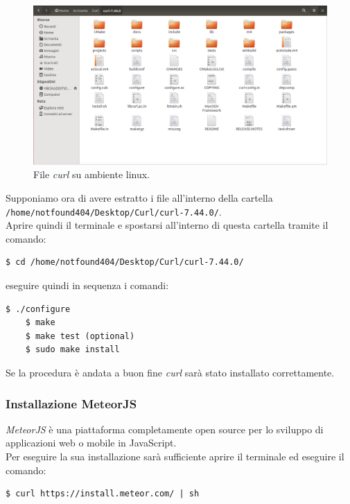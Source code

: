 \begin{figure}[h]
\begin{center}
\includegraphics[scale=0.3]{img/curl_files_linux.png}
\caption{File \emph{curl} su ambiente linux.}
\end{center}
\end{figure}

\noindent Supponiamo ora di avere estratto i file all'interno della cartella \\
\verb+/home/notfound404/Desktop/Curl/curl-7.44.0/+.\\
Aprire quindi il terminale e spostarsi all'interno di questa cartella tramite il comando:

\begin{lstlisting}[style=DOS]
	$ cd /home/notfound404/Desktop/Curl/curl-7.44.0/
\end{lstlisting}

eseguire quindi in sequenza i comandi:

\begin{lstlisting}[style=DOS]
	$ ./configure
	$ make
	$ make test (optional)
	$ sudo make install
\end{lstlisting}
Se la procedura è andata a buon fine \emph{curl} sarà stato installato correttamente.

\subsubsection{Installazione MeteorJS}
\emph{MeteorJS} è una piattaforma completamente open source per lo sviluppo di applicazioni web o mobile in JavaScript.\\
Per eseguire la sua installazione sarà sufficiente aprire il terminale ed eseguire il comando:

\begin{lstlisting}[style=DOS]
	$ curl https://install.meteor.com/ | sh
\end{lstlisting}

